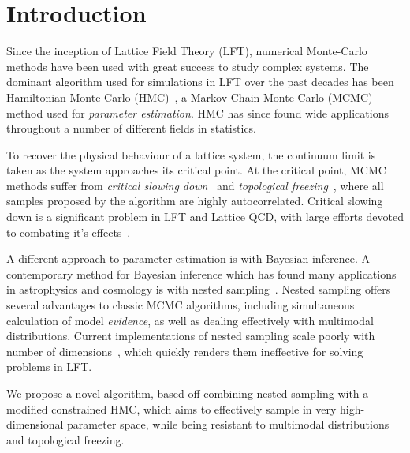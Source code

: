 \documentclass[11pt]{article}
\begin{document}
    \section{Introduction}\label{Introduction}
    Since the inception of Lattice Field Theory (LFT), numerical Monte-Carlo methods have been used with great success to
    study complex systems.
    The dominant algorithm used for simulations in LFT over the past decades has been Hamiltonian Monte Carlo
    (HMC)~\cite{HMC_Duane}, a Markov-Chain Monte-Carlo (MCMC) method used for \emph{parameter estimation}.
    HMC has since found wide applications throughout a number of different fields in statistics.

    To recover the physical behaviour of a lattice system, the continuum limit is taken as the system approaches its
    critical point.
    At the critical point, MCMC methods suffer from \emph{critical slowing down}~\cite{CriticalSlowingWOLFF} and
    \emph{topological freezing}~\cite{Hasenbusch_2018}, where all samples proposed by the algorithm are highly
    autocorrelated.
    Critical slowing down is a significant problem in LFT and Lattice QCD, with large efforts devoted to combating
    it's effects~\cite{Pawlowski_2020,Jansen_MLMC_2020,Albergo_Flow_LFT_2019}.

    A different approach to parameter estimation is with Bayesian inference.
    A contemporary method for Bayesian inference which has found many applications in astrophysics and cosmology
    is with nested sampling~\cite{Skilling2006,Handley_polychord}.
    Nested sampling offers several advantages to classic MCMC algorithms, including simultaneous calculation of model
    \emph{evidence}, as well as dealing effectively with multimodal distributions.
    Current implementations of nested sampling scale poorly with number of dimensions~\cite{Feroz_2009}, which quickly
    renders them ineffective for solving problems in LFT.

    We propose a novel algorithm, based off combining nested sampling with a modified constrained HMC, which aims
    to effectively sample in very high-dimensional parameter space, while being resistant to multimodal distributions
    and topological freezing.
\end{document}
